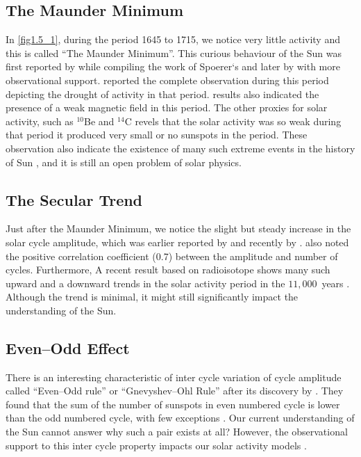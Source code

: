 \subsection{The Maunder Minimum}
In \autoref{fig1.5_1}, during the period 1645 to 1715, we notice very little activity and this is called ``The Maunder Minimum''. This curious behaviour of the Sun was first reported by \cite{Maunder1890} while compiling the work of Spoerer`s and later by \citet{Eddy1976} with more observational support. \citet{Hoyt1998} reported the complete observation during this period depicting the drought of activity in that period. \cite{NesmeRibes1993} results also indicated the presence of a weak magnetic field in this period. The other proxies for solar activity, such as $^{10}$Be \citep{Beer1998} and $^{14}$C \citep{Stuiver1980} revels that the solar activity was so weak during that period it produced very small or no sunspots in the period. These observation also indicate the existence of many such extreme events in the history of Sun \citep{Usoskin2013}, and it is still an open problem of solar physics.


\subsection{The Secular Trend}

Just after the Maunder Minimum, we notice the slight but steady increase in the solar cycle amplitude, which was earlier reported by \citet{Wilson1988} and recently by \citet{Svalgaard2012}. \citet{Hathaway2002} also noted the positive correlation coefficient (0.7) between the amplitude and number of cycles. Furthermore,  A recent result based on radioisotope shows many such upward and a downward trends in the solar activity period in the $11,000$~years \citep{Solanki2004}. Although the trend is minimal, it might still significantly impact the understanding of the Sun. 

\subsection{Even--Odd Effect}

There is an interesting characteristic of inter cycle variation of cycle amplitude called ``Even--Odd rule'' or ``Gnevyshev–Ohl Rule'' after its discovery by \citet{Gnevyshev1948}. They found that the sum of the number of sunspots in even numbered cycle is lower than the odd numbered cycle, with few exceptions \citep[see][Figure~40]{Hathaway2015}. Our current understanding of the Sun cannot answer why such a pair exists at all? However, the observational support to this inter cycle property impacts our solar activity models \citep{Sheeley2005}.  

